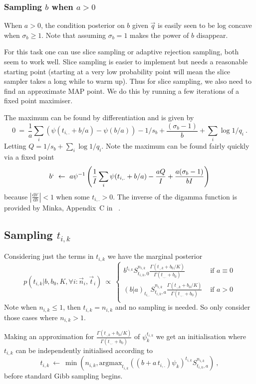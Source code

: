 \documentclass{article}
\begin{document}
\subsubsection{Sampling $b$ when $a>0$}
When $a>0$, the condition posterior on $b$ given $\vec{q}$ is
easily seen to be log concave when $\sigma_b\ge 1$.
Note that assuming $\sigma_b= 1$ makes the power of $b$ disappear.

For this task one can use slice sampling or adaptive rejection
sampling, both seem to work well.  Slice sampling is
easier to implement but needs a reasonable
starting point
(starting at a very low probability point will mean the
slice sampler takes a long while to warm up).
Thus for slice sampling, we also need to find an
approximate MAP point.  We do this by running a few
iterations of a fixed point maximiser.

The maximum can be found by differentiation and is given by
\[
0~=~ \frac{1}{a}\sum_i \left(\psi(t_{i,.}+b/a) -\psi(b/a)\right)
- 1/s_b+ \frac{(\sigma_b-1)}{b}
     +\sum_i \log 1/q_i      ~.
\]
Letting $Q=1/s_b+\sum_i \log 1/q_i$.
Note the maximum can be found fairly quickly via a fixed point
\[
b` ~\leftarrow ~a 
      \psi^{-1}\left(\frac{1}{I}\sum_i \psi(t_{i,.}+b/a) - \frac{aQ}{I}
      + \frac{a(\sigma_b-1)}{bI}\right)
\]
because
$\left|\frac{\mbox{d}b'}{\mbox{d}b}\right|<1$ 
when some $t_{i,.}>0$. 
The inverse of the digamma function is provided by Minka, 
Appendix~C in ~\cite{Minka00}.

\subsection{Sampling $t_{i,k}$}
Considering just the terms in $t_{i,k}$ we have the marginal posterior
\[
p\left(t_{i,k} | b ,b_0,K,\forall i : \vec{n}_i, \vec{t}_i\right) ~\propto~
\left\{
\begin{array}{lr}
b^{t_{i,k}}  S^{n_{i,k}}_{t_{i,k},0}  \frac{\Gamma(t_{.,k}+b_0/K)}{\Gamma(t_{.,.}+b_0)}
 & \mbox{ if } a \equiv 0\\
(b|a)_{t_{i,.}}  S^{n_{i,k}}_{t_{i,k},a}  \frac{\Gamma(t_{.,k}+b_0/K)}{\Gamma(t_{.,.}+b_0)}
 & \mbox{ if } a > 0\\
\end{array}
\right.
\]
Note when $n_{i,k}\le 1$, then $t_{i,k}=n_{i,k}$ and no 
sampling is needed.  So only consider those cases where $n_{i,k}>1$.

Making an approximation for
$\frac{\Gamma(t_{.,k}+b_0/K)}{\Gamma(t_{.,.}+b_0)}$
of $\psi_k^{t_{i,k}}$ we get an initialisation where
$t_{i,k}$ can be independently initialised according to
\[
t_{i,k}~\leftarrow ~ 
\min\left(n_{i,k}, \mbox{argmax}_{t_{i,k}} \left((b+a\,t_{i,.})\psi_k\right) ^{t_{i,k}}  S^{n_{i,k}}_{t_{i,k},a} \right)~,
\]
before standard Gibb sampling begins.
\end{document}
